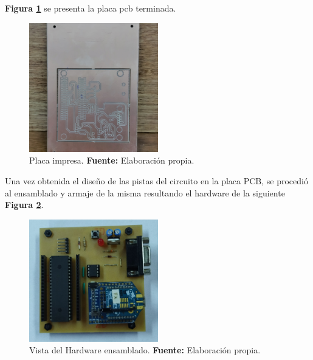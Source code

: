 




\textbf{Figura \ref{Esch9}} se presenta la placa pcb terminada. 


\begin{figure}[H]
	\centering
	\includegraphics[width=0.5\textwidth]{./Cap4imagen/placa_pcb_4.jpg}
	\caption[Placa impresa.]{Placa impresa. \textbf{ Fuente:} Elaboración propia.}
	\label{Esch9} %
\end{figure}


Una vez obtenida el diseño de las pistas del circuito en la placa PCB, se procedió al ensamblado y armaje de la misma resultando el hardware de la siguiente \textbf{Figura \ref{Esch10}}.


 
\begin{figure}[H]
	\centering
	\includegraphics[width=0.5\textwidth]{./Cap4imagen/cto_ensamblado_4.jpg}
	\caption[Vista del Hardware ensamblado.]{Vista del Hardware ensamblado.\textbf{ Fuente:} Elaboración propia.}
	\label{Esch10} %
\end{figure}







